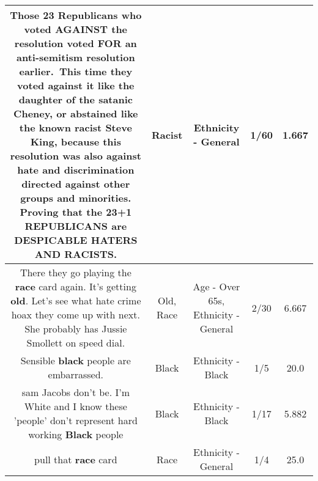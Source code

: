 \documentclass[11pt]{article}
\newlength\mylength
\begin{document}
\begin{center}
\begin{longtable}{|C{.65\mylength}|C{.30\mylength}|C{.12\mylength}|C{.12\mylength}|C{.12\mylength}|}
  \small Those 23 Republicans who voted AGAINST the resolution voted FOR an anti-semitism resolution earlier. This time they voted against it like the daughter of the satanic Cheney, or abstained like the known \textbf{racist} Steve King, because this resolution was also against hate and discrimination directed against other groups and minorities. Proving that the 23+1 REPUBLICANS are DESPICABLE HATERS AND RACISTS.\normalsize   & Racist & Ethnicity - General & 1/60 & 1.667 \\  \hline
  \small There they go playing the \textbf{race} card again. It's getting \textbf{old}.  Let's see what hate crime hoax they come up with next. She probably has Jussie Smollett on speed dial.\normalsize   & Old, Race & Age - Over 65s, Ethnicity - General & 2/30 & 6.667 \\  \hline
  \small Sensible \textbf{black} people are embarrassed.\normalsize   & Black & Ethnicity - Black & 1/5 & 20.0 \\  \hline
  \small sam Jacobs don't be. I'm White and I know these 'people' don't represent hard working \textbf{Black} people\normalsize   & Black & Ethnicity - Black & 1/17 & 5.882 \\  \hline
  \small pull that \textbf{race} card\normalsize   & Race & Ethnicity - General & 1/4 & 25.0 \\  \hline

\end{longtable}
\end{center}
\end{document}
